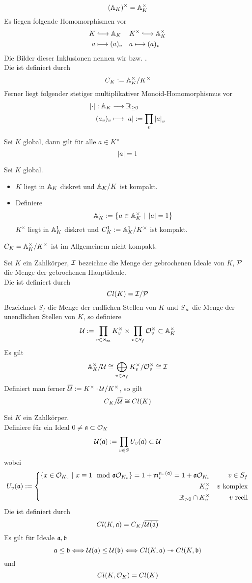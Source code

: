 \Bem{}
\[(\A_K)^\times = \A_K^\times \]
Es liegen folgende Homomorphismen vor
\begin{align*}
K & \Inj{} \A_K && K^\times \Inj{} \A_K^\times\\
a & \longmapsto (a)_v && a\longmapsto (a)_v
\end{align*}
Die Bilder dieser Inklusionen nennen wir  bzw. .\\
Die  ist definiert durch
\[ C_K := \A_K^\times / K^\times \]
Ferner liegt folgender stetiger multiplikativer Monoid-Homomorphismus vor
\begin{align*}
\bet{\cdot} : \A_K &\Pfeil{} \R_{\geq 0}\\
(a_v)_v & \longmapsto \bet{a} := \prod_{v}\bet{a}_v
\end{align*}

Sei $K$ global, dann gilt für alle $a \in K^\times$
\[ \bet{a} = 1 \]

\Satz{}
Sei $K$ global.
\begin{itemize}
\item $K$ liegt in $\A_K$ diskret und $\A_K/K$ ist kompakt.
\item Definiere
\[ \A_K^1 := \set{a\in\A_K^\times}{ \bet{a} = 1 } \]
$K^\times$ liegt in $\A_K^1$ diskret und $C^1_K:= \A_K^1/K^\times$ ist kompakt.
\end{itemize}

\Bem{}
$C_K = \A_K^\times/K^\times$ ist im Allgemeinem nicht kompakt.

Sei $K$ ein Zahlkörper, $\I$ bezeichne die Menge der gebrochenen Ideale von $K$, $\P$ die Menge der gebrochenen Hauptideale.\\
Die  ist definiert durch
\[Cl(K) = \I/\P \]
Bezeichnet $S_f$ die Menge der endlichen Stellen von $K$ und $S_\infty$ die Menge der unendlichen Stellen von $K$, so definiere
\[ \U := \prod_{v\in S_\infty}K_v^\times \times \prod_{v\in S_f} \O_v^\times \subset \A_K^\times \]
Es gilt
\[ \A_K^\times / \U \isom{} \bigoplus_{v\in S_f} K_v^\times / \O_v^\times \isom{} \I  \]
Definiert man ferner $\overline{\U} := K^\times\cdot\U/K^\times$, so gilt
\[ C_K / \overline{\U} \isom{} Cl(K) \]

Sei $K$ ein Zahlkörper.\\
Definiere für ein Ideal $0\neq \af \subset \O_K$
\[ \U(\af) := \prod_{v\in S}U_v(\af) \subset \U \]
wobei
\[ U_v(\af) := \left\lbrace
\begin{aligned}
\{x \in \O_{K_v}~|~x \equiv 1 \mod{\af\O_{K_v}}\} = 1 + \mf_v^{n_v(\af)} = 1 + \af \O_{K_v} && v \in S_f\\
K_v^\times && v \text{ komplex}\\
\R_{>0} \cap K^\times_v && v \text{ reell}
\end{aligned}
\right. \]
Die  ist definiert durch
\[Cl(K, \af) = C_K / \overline{\U(\af)} \]
Es gilt für Ideale $\af,\bf$
\[ \af \leq \bf \Gdw{} \U(\af) \leq \U(\bf) \Gdw{} Cl(K,\af) \surj{} Cl(K,\bf) \]
und
\[ Cl(K,\O_K) = Cl(K) \]

